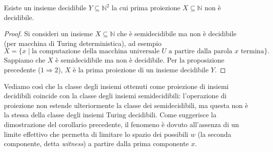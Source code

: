 \begin{coro}
Esiste un insieme decidibile $Y\subseteq\mathbb N^2$ la cui prima proiezione $X\subseteq\mathbb N$ non è decidibile.
\end{coro}

\begin{proof}
Si consideri un insieme $X\subseteq\mathbb N$ che è semidecidibile ma non è decidibile (per macchina di Turing deterministica), ad esempio
\[
X=\{x\mid \text{la computazione della macchina universale } U \text{ a partire dalla parola } x \text{ termina}\}.
\]
Sappiamo che $X$ è semidecidibile ma non è decidibile. Per la proposizione precedente ($1\Rightarrow 2$), $X$ è la prima proiezione di un insieme decidibile $Y$.
\end{proof}

Vediamo così che la classe degli insiemi ottenuti come proiezione di insiemi decidibili coincide con la classe degli insiemi semidecidibili: l'operazione di proiezione non estende ulteriormente la classe dei semidecidibili, ma questa non è la stessa della classe degli insiemi Turing decidibili. Come suggerisce la dimostrazione del corollario precedente, il fenomeno è dovuto all'assenza di un limite effettivo che permetta di limitare lo spazio dei possibili $w$ (la seconda componente, detta \emph{witness}) a partire dalla prima componente $x$.
